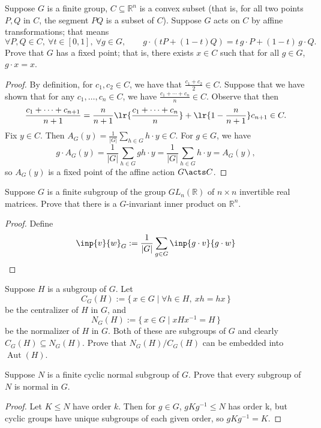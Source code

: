 \documentclass[12pt]{article}
\begin{document}
\begin{homeworkProblem}
Suppose $G$ is a finite group, $C \subseteq \mathbb{R}^n$ is a convex subset (that is, for all two points $P,Q$ in $C$, the segment $PQ$ is a subset of $C$). Suppose $G$ acts on $C$ by affine transformations; that means
\[
  \forall P,Q \in C,\ \forall t \in [0,1],\ \forall g \in G,\qquad g\cdot (tP+(1-t)Q)=t\,g\cdot P + (1-t)\,g\cdot Q.
\]
Prove that $G$ has a fixed point; that is, there exists $x \in C$ such that for all $g \in G$, $g\cdot x = x$.

\begin{proof}
  By definition, for $ c_{1},c_{2}\in C $, we have that $ \frac{c_{1}+c_{2}}{2}\in C $. Suppose that we have shown that for any $ c_{1},\ldots, c_{n}\in C $, we have $ \frac{c_{1}+\cdots+c_{n}}{n}\in C $. Observe that then
  \[
    \frac{c_{1}+ \cdots + c_{n+1}}{n+1} = \frac{n}{n+1}\lr{\frac{c_{1}+\cdots + c_{n}}{n}} + \lr{1-\frac{n}{n+1}} c_{n+1}\in C.
  \]
  Fix $ y\in C $. Then $ A_{G}(y) = \frac{1}{|G|}\sum_{h\in G}h\cdot y\in C $. For $ g\in G $, we have 
  \[
    g\cdot A_{G}(y) = \frac{1}{|G|}\sum_{h\in G} gh\cdot y = \frac{1}{|G|}\sum_{h\in G} h\cdot y = A_{G}(y),
  \]
  so $ A_{G}(y) $ is a fixed point of the affine action $ G\acts C $.

\end{proof}


\end{homeworkProblem}


\begin{homeworkProblem}
Suppose $G$ is a finite subgroup of the group $GL_n(\mathbb{R})$ of $n\times n$ invertible real matrices. Prove that there is a $G$-invariant inner product on $\mathbb{R}^n$.

\begin{proof}
  Define 
  \[
    \inp{v}{w}_{G}:=\frac{1}{|G|}\sum_{g\in G}\inp{g\cdot v}{g\cdot w}
  \]
\end{proof}

\end{homeworkProblem}


\begin{homeworkProblem}
  Suppose $H$ is a subgroup of $G$. Let
  \[
    C_G(H) := \{\, x \in G \mid \forall h \in H,\ xh = hx \,\}
  \]
  be the centralizer of $H$ in $G$, and
  \[
    N_G(H) := \{\, x \in G \mid xHx^{-1} = H \,\}
  \]
  be the normalizer of $H$ in $G$. Both of these are subgroups of $G$ and clearly $C_G(H) \subseteq N_G(H)$. Prove that $N_G(H)/C_G(H)$ can be embedded into $\operatorname{Aut}(H)$.

\end{homeworkProblem}

\begin{homeworkProblem}
Suppose $N$ is a finite cyclic normal subgroup of $G$. Prove that every subgroup of $N$ is normal in $G$.

\begin{proof}
  Let $ K\leq N $ have order $ k $. Then for $ g\in G $, $ gKg^{-1}\leq N $ has order k, but cyclic groups have unique subgroups of each given order, so $ gKg^{-1}=K $.
\end{proof}
\end{homeworkProblem}
\end{document}
